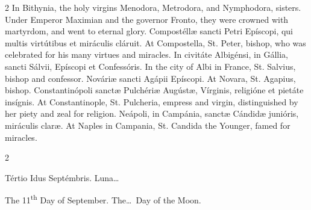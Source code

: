 \begin{paracol}{2}
\switchcolumn
{}
In Bithynia, the holy virgins 
 Menodora, Metrodora, and Nymphodora, sisters. Under Emperor Maximian 
 and the governor Fronto, they were crowned with martyrdom, and went to 
 eternal glory.
\switchcolumn*
{}
Compostéllæ sancti 
 Petri Epíscopi, qui multis virtútibus et miráculis cláruit.
\switchcolumn
{}
At Compostella, St. Peter, bishop, who was celebrated for his many virtues and miracles.
\switchcolumn*
{}
In civitáte Albigénsi, in Gállia, sancti Sálvii, Epíscopi et Confessóris.
\switchcolumn
{}
In the city of Albi in France, St. Salvius, bishop and confessor.
\switchcolumn*
{}
Nováriæ sancti Agápii 
 Epíscopi.
\switchcolumn
{}
At Novara, St. Agapius, bishop.
\switchcolumn*
{}
Constantinópoli sanctæ 
 Pulchériæ Augústæ, Vírginis, religióne et pietáte insígnis.
\switchcolumn
{}
At Constantinople, St. Pulcheria, 
 empress and virgin, distinguished by her piety and zeal for religion.
\switchcolumn*
{}
Neápoli, in Campánia, sanctæ Cándidæ junióris, miráculis claræ.
\switchcolumn
{}
At Naples in Campania, St. Candida 
 the Younger, famed for miracles.
\switchcolumn*
{}
\end{paracol}


\begin{paracol}{2}
\begin{center}{\color{gregoriocolor} Tértio Idus Septémbris. 
 Luna\dots\ }\end{center}
\switchcolumn
{}
\begin{center}{\color{gregoriocolor} The   11\textsuperscript{th} Day of 
 September. The\dots\ Day of the Moon.}\end{center}
\end{paracol}

